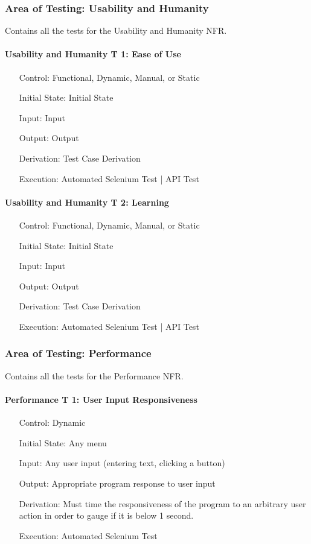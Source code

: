 \documentclass[12pt, titlepage]{article}
\begin{document}
\subsubsection{Area of Testing: Usability and Humanity}

Contains all the tests for the Usability and Humanity NFR.

\paragraph*{Usability and Humanity T 1: Ease of Use}
\begin{itemize}
	\item[Control:] Functional, Dynamic, Manual, or Static
	\item[Initial State:] Initial State
	\item[Input:] Input
	\item[Output:] Output
	\item[Derivation:] Test Case Derivation
	\item[Execution:] Automated Selenium Test | API Test
\end{itemize}

\paragraph*{Usability and Humanity T 2: Learning}
\begin{itemize}
	\item[Control:] Functional, Dynamic, Manual, or Static
	\item[Initial State:] Initial State
	\item[Input:] Input
	\item[Output:] Output
	\item[Derivation:] Test Case Derivation
	\item[Execution:] Automated Selenium Test | API Test
\end{itemize}

\subsubsection{Area of Testing: Performance}

Contains all the tests for the Performance NFR.

\paragraph*{Performance T 1: User Input Responsiveness}
\begin{itemize}
	\item[Control:] Dynamic
	\item[Initial State:] Any menu
	\item[Input:] Any user input (entering text, clicking a button)
	\item[Output:] Appropriate program response to user input
	\item[Derivation:] Must time the responsiveness of the program to an arbitrary user action in order to gauge if it is below 1 second.
	\item[Execution:] Automated Selenium Test
\end{itemize}
\end{document}
